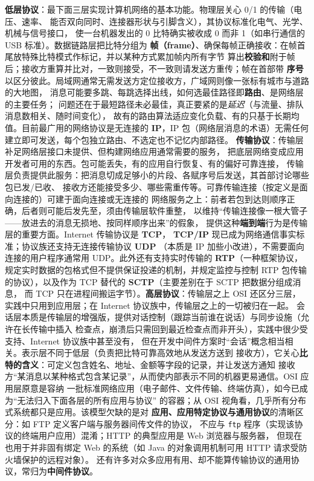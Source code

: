 \begin{ideabox}
\textbf{低层协议}：最下面三层实现计算机网络的基本功能。物理层关心 0/1 的传输（电压、速率、
能否双向同时、连接器形状与引脚含义），其协议标准化电气、光学、机械与信号接口，
使一台机器发出的 0 比特确实被收成 0 而非 1（如串行通信的 USB 标准）。数据链路层把比特分组为
\textbf{帧（frame）}、确保每帧正确接收：在帧首尾放特殊比特模式作标记，并以某种方式累加帧内所有字节
算出\textbf{校验和}附于帧后；接收方重算并比对，一致则接受，不一致则请发送方重传；帧在首部带
\textbf{序号}以区分彼此。局域网通常无需发送方定位接收方，广域网则像一张标有城市与道路的大地图，
消息可能要多跳、每跳选择出线，如何选最佳路径即\textbf{路由}、是网络层的主要任务；
问题还在于最短路径未必最佳，真正要紧的是\emph{延迟}（与流量、排队消息数相关、随时间变化），
故有的路由算法适应变化负载、有的只基于长期均值。目前最广用的网络协议是无连接的
\textbf{IP}，IP 包（网络层消息的术语）无需任何建立即可发送，每个包独立路由、不选定也不记忆内部路径。
\textbf{传输协议}：传输层补足网络层接口未提供、但构建网络应用通常需要的服务，
把底层网络变成应用开发者可用的东西。包可能丢失，有的应用自行恢复、有的偏好可靠连接，
传输层负责提供此服务：把消息切成足够小的片段、各赋序号后发送，其首部讨论哪些包已发/已收、
接收方还能接受多少、哪些需重传等。可靠传输连接（按定义是面向连接的）可建于面向连接或无连接的
网络服务之上：前者若包到达则顺序正确，后者则可能后发先至，须由传输层软件重整，
以维持“传输连接像一根大管子——放进去的消息无损地、按同样顺序出来”的假象，
提供这种\textbf{端到端}行为是传输层的重要方面。Internet 传输协议是 \textbf{TCP}，
\textbf{TCP/IP} 现已成为网络通信事实标准；协议族还支持无连接传输协议 \textbf{UDP}
（本质是 IP 加些小改进），不需要面向连接的用户程序通常用 UDP。此外还有支持实时传输的
\textbf{RTP}（一种框架协议，规定实时数据的包格式但不提供保证投递的机制，并规定监控与控制
RTP 包传输的协议），以及作为 TCP 替代的 \textbf{SCTP}（主要差别在于 SCTP 把数据分组成消息，
而 TCP 只在进程间搬运字节）。\textbf{高层协议}：传输层之上 OSI 还区分三层，
实践中只用到应用层；在 Internet 协议族中，传输层之上的一切被归在一起。
会话层本质是传输层的增强版，提供对话控制（跟踪当前谁在说话）与同步设施（允许在长传输中插入
检查点，崩溃后只需回到最近检查点而非开头），实践中很少受支持、Internet 协议族中甚至没有，
但在开发中间件方案时“会话”概念相当相关。表示层不同于低层（负责把比特可靠高效地从发送方送到
接收方），它关心\textbf{比特的含义}：可定义包含姓名、地址、金额等字段的记录，并让发送方通知
接收方“某消息以某种格式包含某记录”，从而使内部表示不同的机器更易通信。OSI 应用层原意是容纳
一批标准网络应用（电子邮件、文件传输、终端仿真），如今已成为“无法归入下面各层的所有应用与协议”
的容器；从 OSI 视角看，几乎所有分布式系统都只是应用。该模型欠缺的是对
\textbf{应用、应用特定协议与通用协议}的清晰区分：如 FTP 定义客户端与服务器间传文件的协议，
不应与 \texttt{ftp} 程序（实现该协议的终端用户应用）混淆；HTTP 的典型应用是 Web 浏览器与服务器，
但现在也用于并非固有绑定 Web 的系统（如 Java 的对象调用机制可用 HTTP 请求受防火墙保护的远程对象）。
还有许多对众多应用有用、却不能算传输协议的通用协议，常归为\textbf{中间件协议}。
\end{ideabox}

